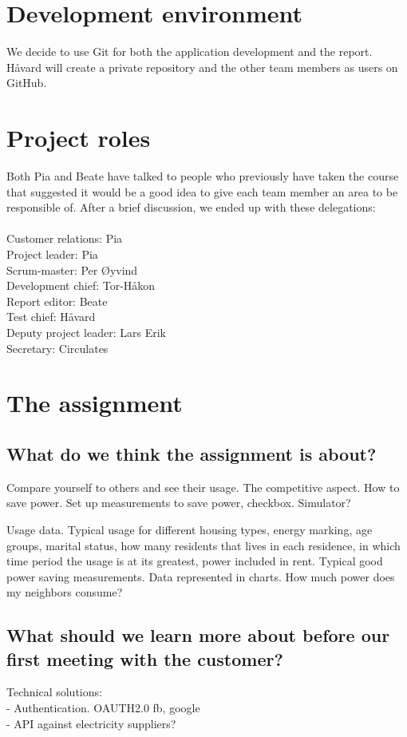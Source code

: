 \documentclass[12pt]{article}
\begin{document}
\section{Development environment}
We decide to use Git for both the application development and the report. Håvard will create a private repository and the other team members as users on GitHub.


\section{Project roles}
Both Pia and Beate have talked to people who previously have taken the course that suggested it would be a good idea to give each team member an area to be responsible of. After a brief discussion, we ended up with these delegations:\\\\
Customer relations: Pia\\
Project leader: Pia\\
Scrum-master: Per Øyvind\\
Development chief: Tor-Håkon\\
Report editor: Beate\\
Test chief: Håvard\\
Deputy project leader: Lars Erik\\
Secretary: Circulates


\section{The assignment}
\subsection{What do we think the assignment is about?}
Compare yourself to others and see their usage. The competitive aspect. How to save power. Set up measurements to save power, checkbox. Simulator?

Usage data. Typical usage for different housing types, energy marking, age groups, marital status, how many residents that lives in each residence, in which time period the usage is at its greatest, power included in rent. Typical good power saving measurements. Data represented in charts. How much power does my neighbors consume?

\subsection{What should we learn more about before our first meeting with the customer?}
Technical solutions:\\
- Authentication. OAUTH2.0 fb, google\\
- API against electricity suppliers?
\end{document}
